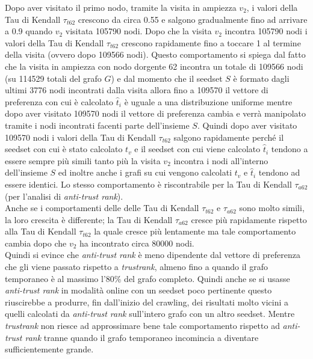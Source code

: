 Dopo aver visitato il primo nodo, tramite la visita in ampiezza \(v_2\), i valori della Tau di Kendall \(\tau_{t62}\) crescono da circa 0.55  e salgono gradualmente fino ad arrivare a 0.9 quando \(v_2\) visitata 105790 nodi. Dopo che  la visita \(v_2\) incontra 105790 nodi i valori della Tau di Kendall \(\tau_{t62}\) crescono rapidamente fino a toccare 1 al termine della visita (ovvero dopo 109566 nodi). Questo comportamento si spiega dal fatto che la visita in ampiezza con nodo dorgente 62 incontra un totale di 109566 nodi (su 114529 totali del grafo \(G\)) e dal momento che il seedset \(S\) è formato dagli ultimi 3776 nodi incontrati dalla visita allora fino a 109570 il vettore di preferenza con cui è calcolato \(\hat{t}_i\) è uguale a una distribuzione uniforme mentre dopo aver visitato 109570 nodi il vettore di preferenza cambia e verrà manipolato tramite i nodi incontrati facenti parte dell'insieme \(S\). Quindi dopo aver visitato 109570 nodi i valori della Tau di Kendall \(\tau_{t62}\) salgono 
rapidamente perché il seedset con cui è stato calcolato \(t_v\) e il seedset con cui viene calcolato \(\hat{t}_i\) tendono a essere sempre più simili tanto più la visita \(v_2\) incontra i nodi all'interno dell'insieme \(S\) ed inoltre anche i grafi su cui vengono calcolati \(t_v\) e \(\hat{t}_i\) tendono ad essere identici. Lo stesso comportamento è riscontrabile per la Tau di Kendall \(\tau_{a62}\) (per l'analisi di \textit{anti-trust rank}).\\ 
Anche se i comportamenti delle delle Tau di Kendall \(\tau_{t62}\) e \(\tau_{a62}\) sono molto simili, la loro crescita è differente; la Tau di Kendall \(\tau_{a62}\) cresce più rapidamente rispetto alla Tau di Kendall \(\tau_{t62}\) la quale cresce più lentamente ma tale comportamento cambia dopo che \(v_2\) ha incontrato circa 80000 nodi.\\
Quindi si evince che \textit{anti-trust rank} è meno dipendente dal vettore di preferenza che gli viene passato rispetto a \textit{trustrank}, almeno fino a quando il grafo temporaneo è al massimo l'80\% del grafo completo. Quindi anche se si usasse \textit{anti-trust rank} in modalità online con un seedset poco pertinente questo riuscirebbe a produrre, fin dall'inizio del crawling, dei risultati molto vicini a quelli calcolati da \textit{anti-trust rank} sull'intero grafo con un altro seedset. Mentre \textit{trustrank} non riesce ad approssimare bene tale comportamento rispetto ad \textit{anti-trust rank} tranne quando il  grafo temporaneo incomincia a diventare sufficientemente grande.

